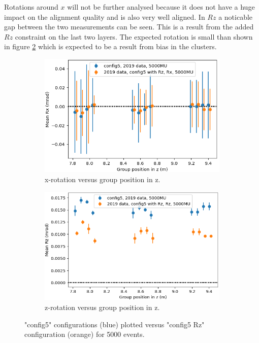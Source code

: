 Rotations around $x$ will not be further analysed because it does not have a huge impact on the alignment quality and is also very well aligned. In $Rz$ a noticable gap
between the two measurements can be seen. This is a result from the added $Rz$
constraint on the last two layers. The expected rotation is small than shown in figure \ref{fig:config5_Rz} which is expected to be a result from bias in the clusters.

\begin{figure}
  \centering
  \begin{subfigure}[b]{0.4\textwidth}
    \centering
    \includegraphics[width=\textwidth]{plots/renewed_plots/Rx.png}
    \caption{x-rotation versus group position in z.}
    \label{fig:config5_Rx}
  \end{subfigure}
  \hfill
  \begin{subfigure}[b]{0.4\textwidth}
    \centering
    \includegraphics[width=\textwidth]{plots/renewed_plots/Rz.png}
    \caption{z-rotation versus group position in z.}
    \label{fig:config5_Rz}
  \end{subfigure}
  \caption{"config5" configurations (blue) plotted versus "config5 Rz" configuration (orange) for 5000 events.}
  \label{fig:config5_rot}
\end{figure}

